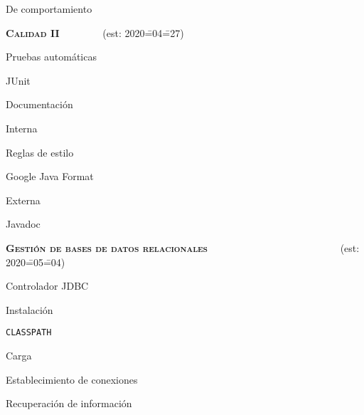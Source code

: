 \begin{longenum}
\begin{longenum}
\begin{longenum}
            \item De comportamiento
        \end{longenum}
    \end{longenum}
    \item \textbf{\textsc{Calidad II}} \ \ \ \ \ \ \ \ (est: 2020\==04\==27)
    \begin{longenum}
        \item Pruebas automáticas
        \begin{longenum}
            \item JUnit
        \end{longenum}
        \item Documentación
        \begin{longenum}
            \item Interna
            \begin{longenum}
                \item Reglas de estilo
                \item Google Java Format
            \end{longenum}
            \item Externa
            \begin{longenum}
                \item Javadoc
            \end{longenum}
        \end{longenum}
    \end{longenum}
    \item \textbf{\textsc{Gestión de bases de datos relacionales}} \ \ \ \ \ \ \ \ \ \ \ \ \ \ \ \ \ \ \ \ \ \ \ \ \ \ (est: 2020\==05\==04)
    \begin{longenum}
        \item Controlador JDBC
        \begin{longenum}
            \item Instalación
            \item \texttt{CLASSPATH}
            \item Carga
        \end{longenum}
        \item Establecimiento de conexiones
        \item Recuperación de información
        \begin{longenum}

\end{longenum}
\end{longenum}
\end{longenum}
